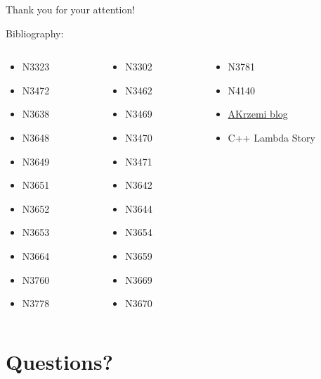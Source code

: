 \documentclass[10pt]{beamer}
\begin{document}
\begin{frame}{Thank you for your attention!}

\vfill Bibliography:
\small

\begin{columns}[T]
	\begin{column}{0.28\linewidth}	
\begin{itemize}
	\item N3323
	\item N3472
	\item N3638
	\item N3648
	\item N3649
	\item N3651
	\item N3652
	\item N3653
	\item N3664
	\item N3760
	\item N3778
\end{itemize}
	\end{column}

	\begin{column}{0.28\linewidth}
	\begin{itemize}
	\item N3302
	\item N3462
	\item N3469
	\item N3470
	\item N3471
	\item N3642
	\item N3644
	\item N3654
	\item N3659
	\item N3669
	\item N3670
	\end{itemize}
	\end{column}

\begin{column}{0.28\linewidth}
 \begin{itemize}
 	\item N3781
 	\item N4140
 	\item \href{https://akrzemi1.wordpress.com/}{AKrzemi blog}
 	\item C++ Lambda Story
 \end{itemize}
\end{column}

\end{columns}
\end{frame}

\section{Questions?}
\end{document}
